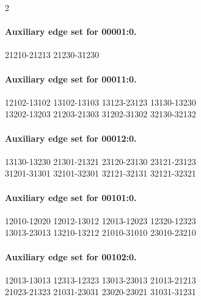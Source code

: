\begin{multicols}{2}
\paragraph{Auxiliary edge set for 00001:0.}
\begingroup\footnotesize\ttfamily\begin{flushleft}
21210-21213 21230-31230\\
\end{flushleft}\endgroup
\paragraph{Auxiliary edge set for 00011:0.}
\begingroup\footnotesize\ttfamily\begin{flushleft}
12102-13102 13102-13103 13123-23123 13130-13230\\
13202-13203 21203-21303 31202-31302 32130-32132\\
\end{flushleft}\endgroup
\paragraph{Auxiliary edge set for 00012:0.}
\begingroup\footnotesize\ttfamily\begin{flushleft}
13130-13230 21301-21321 23120-23130 23121-23123\\
31201-31301 32101-32301 32121-32131 32121-32321\\
\end{flushleft}\endgroup
\paragraph{Auxiliary edge set for 00101:0.}
\begingroup\footnotesize\ttfamily\begin{flushleft}
12010-12020 12012-13012 12013-12023 12320-12323\\
13013-23013 13210-13212 21010-31010 23010-23210\\
\end{flushleft}\endgroup
\paragraph{Auxiliary edge set for 00102:0.}
\begingroup\footnotesize\ttfamily\begin{flushleft}
12013-13013 12313-12323 13013-23013 21013-21213\\
21023-21323 21031-23031 23020-23021 31031-31231\\
\end{flushleft}\endgroup

\end{multicols}
